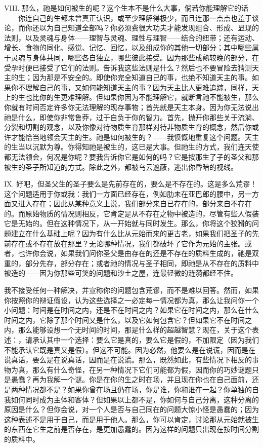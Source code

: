 VIII. 那么，祂是如何被生的呢？这个生本不是什么大事，倘若你能理解它的话——你连自己的生都未曾真正认识，或至少理解得极少，而且连那一点点也羞于谈论，而你还以为自己知道全部吗？你必须费很大功夫才能发现组合、形成、显现的法则，以及灵魂与身体——理智与灵魂、理性与理智——结合的纽带；还有运动、增长、食物的同化、感觉、记忆、回忆，以及组成你的其他一切部分；其中哪些属于灵魂与身体共同，哪些各自独立，哪些彼此接受。因为那些成熟较晚的部分，在受孕时便已接受了它们的法则。告诉我这些法则是什么？然后也不要冒险去猜测天主的生；因为那是不安全的。即使你完全知道自己的事，也绝不知道天主的事。如果你不理解自己的事，又如何能知道天主的事？因为天主比人更难追踪，同样，天上的生也比你的生更难理解。但如果你因为不能理解它，就断言祂不能被生，那么你就有时间否定许多你无法理解的现存事物；首先就是天主本身。因为你无法说出祂是什么，即使你非常鲁莽，过于自负于你的智力。首先，抛开你那些关于流淌、分裂和切割的观念，以及你像对待物质生育那样对待非物质生育的概念，然后你或许才能恰当地领会天主的生。祂是如何被生的？——我愤慨地重复这个问题。天主的生当以沉默为尊。你得知祂是被生的，这已是大事。但祂生的方式，我们连天使都无法领会，何况是你呢？要我告诉你它是如何的吗？它是按那生了子的圣父和那被生的圣子所知道的方式。除此之外，都被乌云遮蔽，逃出你昏暗的视线。\par

IX. 好吧，但圣父生的圣子要么是先前存在的，要么是不存在的。这是多么荒谬！这个问题适用于你或我：我们一方面已经存在，例如肋未在亚巴郎的腰中，另一方面又进入存在；因此从某种意义上说，我们部分来自已存在的，部分来自不存在的。而原始物质的情况则相反，它肯定是从不存在之物中被造的，尽管有些人假装它是无始的。但在这种情况下，从一开始就与同时发生。那么，你将这个狡猾的问题建立在什么基础上呢？因为有什么比从元始而来的更古老，如果我们把圣子的先前存在或不存在放在那里？无论哪种情况，我们都破坏了它作为元始的主张。或者，也许你会说，如果我们问你圣父是由存在的还是不存在的质料生成的，祂是双重的，部分先存，部分存在；或者祂的情况与圣子相同，即祂是从不存在的质料中被造的——因为你那些可笑的问题和沙土之屋，连最轻微的涟漪都经不住。\par

我不接受任何一种解决，并宣称你的问题包含荒谬，而不是难以回答。然而，如果你按照你的辩证假设，认为这些选择之一必定每一情况都为真，那么让我问你一个小问题：时间是在时间之内，还是不在时间之内？如果它在时间之内，那么在什么时间之内，它除了那个时间又是什么，以及它如何包含它？但如果它不在时间之内，那么能够设想一个无时间的时间，那是什么样的超越智慧？现在，关于这个表述：，请承认其中一个选择：要么它是真的，要么它是假的，不加限定（因为我们不能承认它既是真又是假）。但这不可能。因为必然，他要么是在说谎，因而是在说真话，要么是在说真话，因而是在说谎。那么，既然如此，有些情况下相反的事物为真，那么有什么奇怪，在另一种情况下它们可能都为假，因而你的巧妙谜题只是愚蠢？再为我解一个谜。你是在你的生之时在场，并且现在你也在自己面前，还是两种情况都不是？如果你曾在场且仍在场，你是谁，你和谁在一起？你单独的自我如何同时成为主体和客体？但如果以上都不是，你如何与自己分离，这种分离的原因是什么？但你会说，对一个人是否与自己同在的问题大惊小怪是愚蠢的；因为这种表述不是用于自己，而是用于他人。那么，你可以肯定，讨论那从元始就被生的东西在它生之前是否存在，是更加愚蠢的。因为这样的问题只出现在按时间分割的质料中。\par

